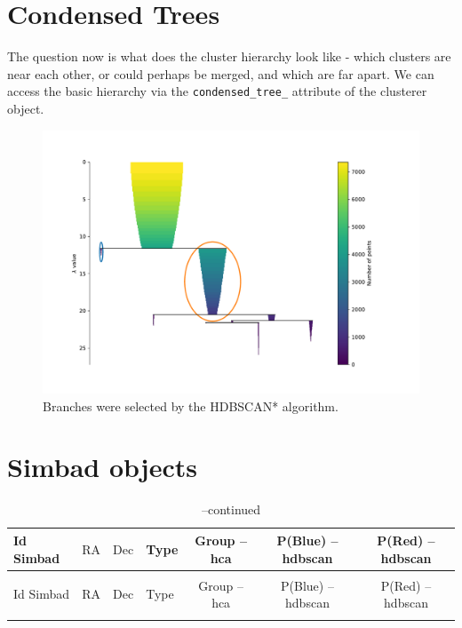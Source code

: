 \documentclass[fleqn,usenatbib]{mnras}
\begin{document}







\appendix
\section{Condensed Trees}
The question now is what does the cluster hierarchy look like - which
clusters are near each other, or could perhaps be merged, and which
are far apart. We can access the basic hierarchy via the \texttt{condensed\_tree\_}
 attribute of the clusterer object.

\begin{figure}
	\includegraphics[width=0.9\linewidth]{Figs/cluster-hierarchy-hdbscan.pdf}
        \caption{Branches were selected by the HDBSCAN* algorithm.}
    \label{fig:emission}
\end{figure}


\newcommand\TableHeader{
  \hline\hline
  Id Simbad & \(\mathrm{RA}\) & \(\mathrm{Dec}\) & Type & Group -- {\sc hca}
                          & P(Blue) -- {\sc hdbscan} & P(Red) -- {\sc hdbscan} \\
  \hline 
}

\section{Simbad objects}

\clearpage
\begin{center}
\begin{longtable}{llclccc}
  \caption{Simbad sources. \label{tab:simbad}}\\
  \TableHeader\endfirsthead 
  \caption[]{--continued}\\
  \TableHeader\endhead
  \hline \endfoot

\end{longtable} 
\end{center}


\bsp	%
\label{lastpage}
\end{document}
